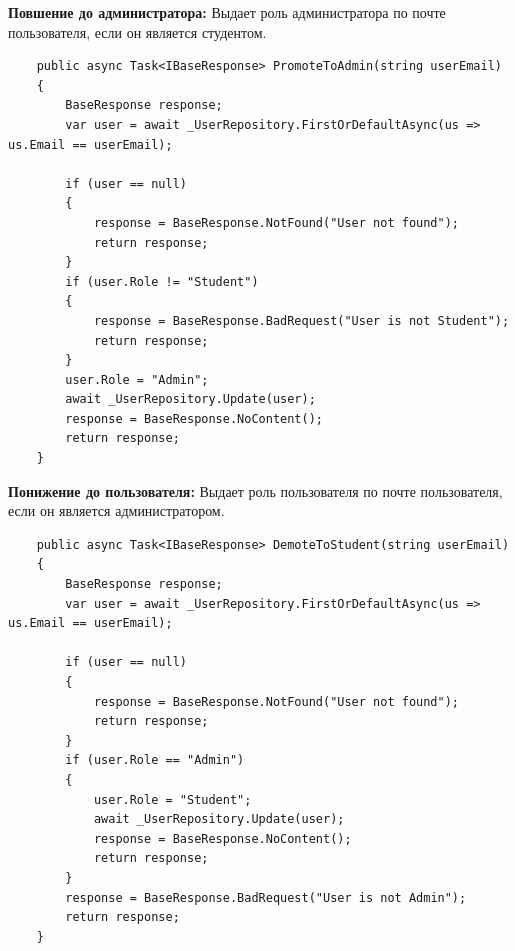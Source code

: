 \textbf{Повшение до администратора:} Выдает роль администратора по почте пользователя, если он является студентом.
\begin{verbatim}
    public async Task<IBaseResponse> PromoteToAdmin(string userEmail)
    {
        BaseResponse response;
        var user = await _UserRepository.FirstOrDefaultAsync(us => us.Email == userEmail);

        if (user == null)
        {
            response = BaseResponse.NotFound("User not found");
            return response;
        }
        if (user.Role != "Student")
        {
            response = BaseResponse.BadRequest("User is not Student");
            return response;
        }
        user.Role = "Admin";
        await _UserRepository.Update(user);
        response = BaseResponse.NoContent();
        return response;
    }
\end{verbatim}

\textbf{Понижение до пользователя:} Выдает роль пользователя по почте пользователя, если он является администратором.
\begin{verbatim}
    public async Task<IBaseResponse> DemoteToStudent(string userEmail)
    {
        BaseResponse response;
        var user = await _UserRepository.FirstOrDefaultAsync(us => us.Email == userEmail);

        if (user == null)
        {
            response = BaseResponse.NotFound("User not found");
            return response;
        }
        if (user.Role == "Admin")
        {
            user.Role = "Student";
            await _UserRepository.Update(user);
            response = BaseResponse.NoContent();
            return response;
        }
        response = BaseResponse.BadRequest("User is not Admin");
        return response;
    }
\end{verbatim}
